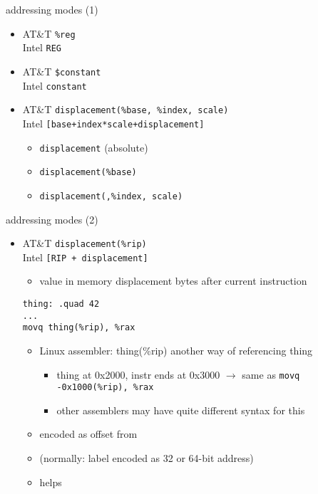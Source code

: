 
\begin{frame}[fragile,label=addressing1]{addressing modes (1)}
    \begin{itemize}
        \item {\small AT\&T} {\tt \%reg}\\ {\small Intel} {\tt REG}
        \item {\small AT\&T} {\tt \$constant} \\{\small Intel} {\tt constant}
        \item {\small AT\&T} {\tt displacement(\%base, \%index, scale)} \\
        {\small Intel} {\tt [base+index*scale+displacement]}
            \begin{itemize}
            \item {\tt displacement} (absolute)
            \item {\tt displacement(\%base)}
            \item {\tt displacement(,\%index, scale)}
            \end{itemize}
    \end{itemize}
\end{frame}

\begin{frame}[fragile,label=addressing2]{addressing modes (2)}
    \begin{itemize}
        \item {\small AT\&T} {\tt displacement(\%rip)} \\
              {\small Intel} {\tt [RIP + displacement]}
            \begin{itemize}
            \item value in memory displacement bytes after current instruction
            \end{itemize}

\begin{lstlisting}
thing: .quad 42
...
movq thing(%rip), %rax
\end{lstlisting}
        \begin{itemize}
        \item Linux assembler: thing(\%rip) another way of referencing thing
            \begin{itemize}
            \item thing at 0x2000, instr ends at 0x3000 $\rightarrow$ same as \texttt{movq -0x1000(\%rip), \%rax}
            \item other assemblers may have quite different syntax for this
            \end{itemize}
        \item encoded as offset from 
        \item (normally: label encoded as 32 or 64-bit address)
        \item helps 
        \end{itemize}
    \end{itemize}
\end{frame}

